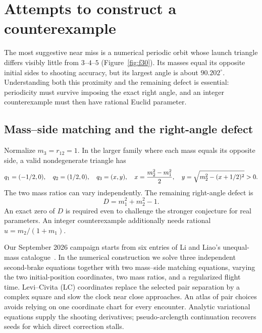 \section{Attempts to construct a counterexample}\label{sec:search}

The most suggestive near miss is a numerical periodic orbit whose launch
triangle differs visibly little from $3$--$4$--$5$
(Figure~\ref{fig:f30}). Its masses equal its opposite initial sides to
shooting accuracy, but its largest angle is about $90.202^\circ$.
Understanding both this proximity and the remaining defect is essential:
periodicity must survive imposing the exact right angle, and an integer
counterexample must then have rational Euclid parameter.

\subsection{Mass--side matching and the right-angle defect}

Normalize $m_3=r_{12}=1$. In the larger family where each mass equals its
opposite side, a valid nondegenerate triangle has
\begin{equation}\label{eq:general-tied}
 q_1=(-1/2,0),\quad q_2=(1/2,0),\quad
 q_3=(x,y),\quad
 x={m_2^2-m_1^2\over2},\quad
 y=\sqrt{m_2^2-(x+1/2)^2}>0.
\end{equation}
The two mass ratios can vary independently. The remaining right-angle
defect is
\begin{equation}\label{eq:defect}
 D=m_1^2+m_2^2-1.
\end{equation}
An exact zero of $D$ is required even to challenge the stronger conjecture
for real parameters. An integer counterexample additionally needs rational
$u=m_2/(1+m_1)$.

Our September 2026 campaign starts from six entries of Li and Liao's
unequal-mass catalogue~\cite{LiLiao}. In the numerical construction we solve
three independent second-brake equations together with two mass--side
matching equations, varying the two initial-position coordinates, two
mass ratios, and a regularized flight time. Levi--Civita (LC) coordinates
replace the selected pair separation by a complex square and slow the
clock near close approaches. An atlas of pair choices avoids relying on
one coordinate chart for every encounter. Analytic variational equations
supply the shooting derivatives; pseudo-arclength continuation recovers
seeds for which direct correction stalls.

